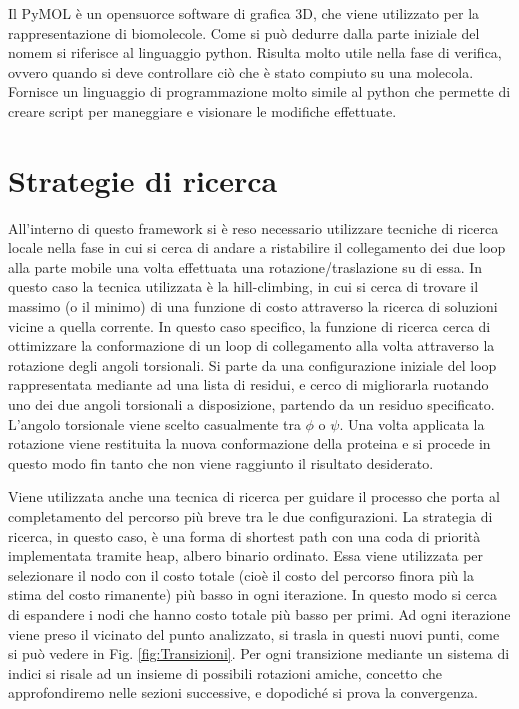 Il PyMOL è un opensuorce software di grafica 3D, che viene utilizzato per la rappresentazione di biomolecole. Come si può dedurre dalla parte iniziale del nomem si riferisce al linguaggio python. Risulta molto utile nella fase di verifica, ovvero quando si deve controllare ciò che è stato compiuto su una molecola. Fornisce un linguaggio di programmazione molto simile al python che permette di creare script per maneggiare e visionare le modifiche effettuate.
 
\section{Strategie di ricerca}\label{sec:Strategiediricerca}
All'interno di questo framework si è reso necessario utilizzare tecniche di ricerca locale nella fase in cui si cerca di andare a ristabilire il collegamento dei due loop alla parte mobile una volta effettuata una rotazione/traslazione su di essa. In questo caso la tecnica utilizzata è la hill-climbing, in cui si cerca di trovare il massimo (o il minimo) di una funzione di costo attraverso la ricerca di soluzioni vicine a quella corrente. In questo caso specifico, la funzione di ricerca cerca di ottimizzare la conformazione di un loop di collegamento alla volta attraverso la rotazione degli angoli torsionali. Si parte da una configurazione iniziale del loop rappresentata mediante ad una lista di residui, e cerco di migliorarla ruotando uno dei due angoli torsionali a disposizione, partendo da un residuo specificato. L'angolo torsionale viene scelto casualmente tra $\phi$ o $\psi$. Una volta applicata la rotazione viene restituita la nuova conformazione della proteina e si procede in questo modo fin tanto che non viene raggiunto il risultato desiderato. 

Viene utilizzata anche una tecnica di ricerca per guidare il processo che porta al completamento del percorso più breve tra le due configurazioni. La strategia di ricerca, in questo caso, è una forma di shortest path con una coda di priorità implementata tramite heap, albero binario ordinato. Essa viene utilizzata per selezionare il nodo con il costo totale (cioè il costo del percorso finora più la stima del costo rimanente) più basso in ogni iterazione. In questo modo si cerca di espandere i nodi che hanno costo totale più basso per primi. Ad ogni iterazione viene preso il vicinato del punto analizzato, si trasla in questi nuovi punti, come si può vedere in Fig. \ref{fig:Transizioni}. Per ogni transizione mediante un sistema di indici si risale ad un insieme di possibili rotazioni amiche, concetto che approfondiremo nelle sezioni successive, e dopodiché si prova la convergenza.

